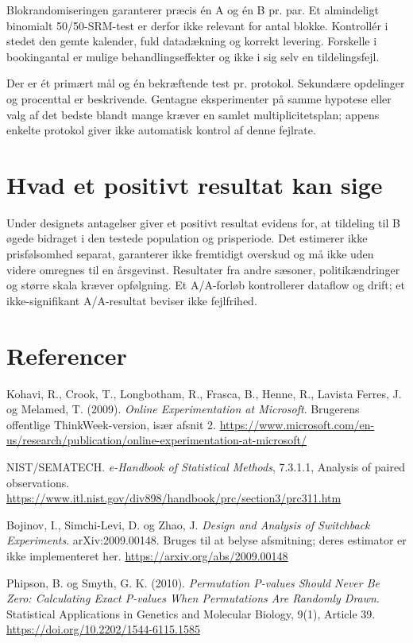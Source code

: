 \documentclass[11pt,a4paper]{article}
\begin{document}
Blokrandomiseringen garanterer præcis én A og én B pr. par. Et almindeligt
binomialt 50/50-SRM-test er derfor ikke relevant for antal blokke. Kontrollér i
stedet den gemte kalender, fuld datadækning og korrekt levering. Forskelle i
bookingantal er mulige behandlingseffekter og ikke i sig selv en tildelingsfejl.

Der er ét primært mål og én bekræftende test pr. protokol. Sekundære opdelinger
og procenttal er beskrivende. Gentagne eksperimenter på samme hypotese eller
valg af det bedste blandt mange kræver en samlet multiplicitetsplan;
appens enkelte protokol giver ikke automatisk kontrol af denne fejlrate.

\section{Hvad et positivt resultat kan sige}
Under designets antagelser giver et positivt resultat evidens for, at tildeling til
B øgede bidraget i den testede population og prisperiode. Det estimerer ikke
prisfølsomhed separat, garanterer ikke fremtidigt overskud og må ikke uden videre
omregnes til en årsgevinst. Resultater fra andre sæsoner, politikændringer og
større skala kræver opfølgning. Et A/A-forløb kontrollerer dataflow og drift;
et ikke-signifikant A/A-resultat beviser ikke fejlfrihed.

\section*{Referencer}
\begin{enumerate}[label={[\arabic*]}]
\item Kohavi, R., Crook, T., Longbotham, R., Frasca, B., Henne, R., Lavista Ferres,
J. og Melamed, T. (2009). \emph{Online Experimentation at Microsoft}.
Brugerens offentlige ThinkWeek-version, især afsnit 2.
\url{https://www.microsoft.com/en-us/research/publication/online-experimentation-at-microsoft/}
\item NIST/SEMATECH. \emph{e-Handbook of Statistical Methods}, 7.3.1.1,
Analysis of paired observations.
\url{https://www.itl.nist.gov/div898/handbook/prc/section3/prc311.htm}
\item Bojinov, I., Simchi-Levi, D. og Zhao, J. \emph{Design and Analysis of
Switchback Experiments}. arXiv:2009.00148. Bruges til at belyse afsmitning;
deres estimator er ikke implementeret her.
\url{https://arxiv.org/abs/2009.00148}
\item Phipson, B. og Smyth, G. K. (2010). \emph{Permutation P-values Should
Never Be Zero: Calculating Exact P-values When Permutations Are Randomly Drawn}.
Statistical Applications in Genetics and Molecular Biology, 9(1), Article 39.
\url{https://doi.org/10.2202/1544-6115.1585}
\end{enumerate}
\end{document}
